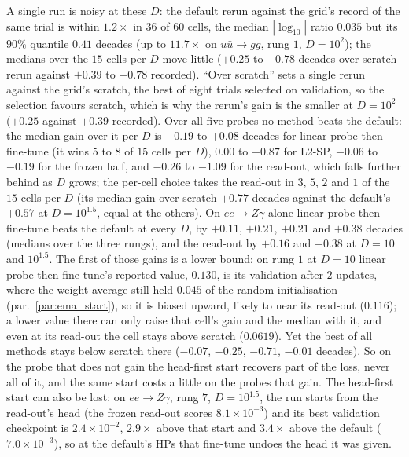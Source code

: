 \documentclass[11pt]{article}
\begin{document}
A single run is noisy at these $D$: the default rerun against the grid's record of the same trial is within $1.2\times$ in
$36$ of $60$ cells, the median $|\log_{10}|$ ratio $0.035$ but its $90\%$ quantile $0.41$ decades (up to $11.7\times$
on $u\bar u\to gg$, rung $1$, $D=10^2$); the medians over the $15$ cells per $D$ move little ($+0.25$ to $+0.78$ decades
over scratch rerun against $+0.39$ to $+0.78$ recorded). ``Over scratch'' sets a single rerun against the grid's scratch,
the best of eight trials selected on validation, so the selection favours scratch, which is why the rerun's gain is
the smaller at $D=10^2$ ($+0.25$ against $+0.39$ recorded). Over all five probes no method beats the default: the median gain
over it per $D$ is $-0.19$ to $+0.08$ decades for linear probe then fine-tune (it wins $5$ to $8$ of $15$ cells per
$D$), $0.00$ to $-0.87$ for L2-SP, $-0.06$ to $-0.19$ for the frozen half, and $-0.26$ to $-1.09$ for the read-out, which
falls further behind as $D$ grows; the per-cell choice takes the read-out in $3$, $5$, $2$ and $1$ of the $15$ cells
per $D$ (its median gain over scratch $+0.77$ decades against the default's $+0.57$ at $D=10^{1.5}$, equal at the others). On $ee\to Z\gamma$ alone linear probe then fine-tune beats the
default at every $D$, by $+0.11$, $+0.21$, $+0.21$ and $+0.38$ decades (medians over the three rungs), and the read-out by
$+0.16$ and $+0.38$ at $D=10$ and $10^{1.5}$. The first of those gains is a lower bound: on rung $1$ at $D=10$ linear
probe then fine-tune's reported value, $0.130$, is its validation after $2$ updates, where the weight average still
held $0.045$ of the random initialisation (par.~\ref{par:ema_start}), so it is biased upward, likely to near its
read-out ($0.116$); a lower value there can only raise that cell's gain and the median with it, and even at its read-out
the cell stays above scratch ($0.0619$). Yet the best of all methods stays below scratch there ($-0.07$, $-0.25$,
$-0.71$, $-0.01$ decades). So on the probe that does not gain the head-first start recovers part of the loss, never all of
it, and the same start costs a little on the probes that gain. The head-first start can also be lost: on $ee\to Z\gamma$, rung
$7$, $D=10^{1.5}$, the run starts from the read-out's head (the frozen read-out scores $8.1\times10^{-3}$) and its best
validation checkpoint is $2.4\times10^{-2}$, $2.9\times$ above that start and $3.4\times$ above the default
($7.0\times10^{-3}$), so at the default's HPs that fine-tune undoes the head it was given.
\end{document}
